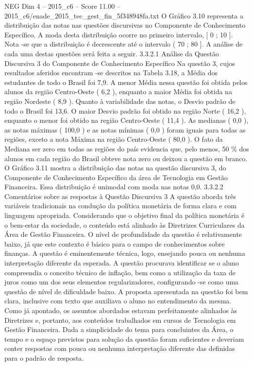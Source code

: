 \begin{textsample}{NEG Dim 4 – 2015\_c6 – Score 11.00 – 2015\_c6/enade\_2015\_tec\_gest\_fin\_5f348948fa.txt}
O Gráfico 3.10 representa a distribuição das notas nas questões discursivas no Componente de Conhecimento Específico.
A moda desta distribuição ocorre no primeiro intervalo, [ 0 ; 10 ].
Nota -se que a distribuição é decrescente até o intervalo ( 70 ; 80 ].
A análise de cada uma destas questões será feita a seguir. 3.3.2.1 Análise da Questão Discursiva 3 do Componente de Conhecimento Específico Na questão 3, cujos resultados aferidos encontram -se descritos na Tabela 3.18, a Média dos estudantes de todo o Brasil foi 7,9.
A menor Média nessa questão foi obtida pelos alunos da região Centro-Oeste ( 6,2 ), enquanto a maior Média foi obtida na região Nordeste ( 8,9 ).
Quanto à variabilidade das notas, o Desvio padrão de todo o Brasil foi 13,6.
O maior Desvio padrão foi obtido na região Norte ( 16,2 ), enquanto o menor foi obtido na região Centro-Oeste ( 11,4 ).
As medianas ( 0,0 ), as notas máximas ( 100,0 ) e as notas mínimas ( 0,0 ) foram iguais para todas as regiões, exceto a nota Máxima na região Centro-Oeste ( 80,0 ).
O fato da Mediana ser zero em todas as regiões do país evidencia que, pelo menos, 50 \% dos alunos em cada região do Brasil obteve nota zero ou deixou a questão em branco.
O Gráfico 3.11 mostra a distribuição das notas na questão discursiva 3, do Componente de Conhecimento Específico da área de Tecnologia em Gestão Financeira.
Essa distribuição é unimodal com moda nas notas 0,0. 3.3.2.2 Comentários sobre as respostas à Questão Discursiva 3 A questão aborda três variáveis tradicionais na condução da política monetária de forma clara e com linguagem apropriada.
Considerando que o objetivo final da política monetária é o bem-estar da sociedade, o conteúdo está alinhado às Diretrizes Curriculares da Área de Gestão Financeira.
O nível de profundidade da questão é relativamente baixo, já que este contexto é básico para o campo de conhecimentos sobre finanças.
A questão é eminentemente técnica, logo, ensejando pouca ou nenhuma interpretação diferente da esperada.
A questão procurava identificar se o aluno compreendia o conceito técnico de inflação, bem como a utilização da taxa de juros como um dos seus elementos regularizadores, configurando -se como uma questão de nível de dificuldade baixo.
A proposta apresentada na questão foi bem clara, inclusive com texto que auxiliava o aluno no entendimento da mesma.
Como já apontado, os assuntos abordados estavam perfeitamente alinhados às Diretrizes e, portanto, aos conteúdos trabalhados em cursos de Tecnologia em Gestão Financeira.
Dada a simplicidade do tema para concluintes da Área, o tempo e o espaço previstos para solução da questão foram suficientes e deveriam conter respostas com pouca ou nenhuma interpretação diferente das definidas para o padrão de resposta.

\end{textsample}
